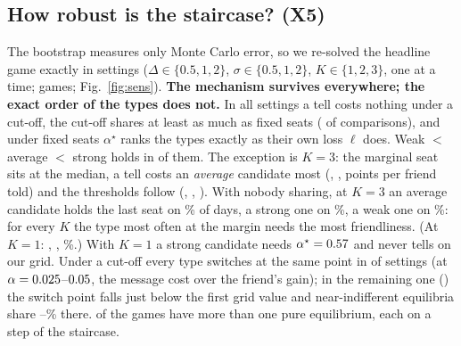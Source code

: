 \documentclass[conference]{IEEEtran}
\theoremstyle{plain}
\theoremstyle{definition}\newtheorem{definition}{Definition}
\newcommand{\finding}[1]{\textbf{#1}}
\begin{document}
\subsection{How robust is the staircase? (X5)}
The bootstrap measures only Monte Carlo error, so we re-solved the headline game exactly in \XfiveSettings{} settings ($\Delta\in\{0.5,1,2\}$, $\sigma\in\{0.5,1,2\}$, $K\in\{1,2,3\}$, one at a time; \XfiveGames{} games; Fig.~\ref{fig:sens}).
\finding{The mechanism survives everywhere; the exact order of the types does not.} In all \XfiveSettings{} settings a tell costs nothing under a cut-off,
the cut-off shares at least as much as fixed seats (\XfiveHtwoCellsOk{} of \XfiveHtwoCells{} comparisons), and under fixed seats $\alpha^\star$ ranks the types exactly as their own loss $\ell$
does. Weak $<$ average $<$ strong holds in \XfiveOrderOk{} of them. The exception is $K=3$: the marginal seat sits at the
median, a tell costs an \emph{average} candidate most (\XfiveKthreeEllWeak, \XfiveKthreeEllAvg, \XfiveKthreeEllStrong{} points per friend told) and the thresholds follow
(\XfiveKthreeWeak, \XfiveKthreeAvg, \XfiveKthreeStrong). With nobody sharing, at $K=3$ an average candidate holds the last seat on \PivKthreeAvg\% of days, a strong one on \PivKthreeStrong\%, a weak one on \PivKthreeWeak\%:
for every $K$ the type most often at the margin needs the most friendliness. (At $K=1$: \PivKoneWeak, \PivKoneAvg, \PivKoneStrong\%.) With $K=1$ a strong candidate needs $\alpha^\star=0.57$ and never tells on our grid. Under a cut-off every type switches at the
same point in \XfiveBarTogether{} of \XfiveSettings{} settings (at $\alpha=0.025$--$0.05$, the message cost over the friend's gain); in the remaining one (\XfiveBarSplitWhere) the switch point
falls just below the first grid value and \XfiveBarSplitN{} near-indifferent equilibria share \XfiveBarSplitLo--\XfiveBarSplitHi\% there. \XfiveMulti{} of the \XfiveGames{} games have more than one pure equilibrium, each on a step of the staircase.
\end{document}
